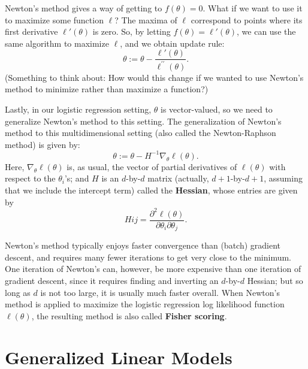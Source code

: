 Newton's method gives a way of getting to $f(\theta) = 0$. What if we want to
use it to maximize some function $\ell$? The maxima of $\ell$ correspond to points
where its first derivative $\ell'(\theta)$ is zero. So, by letting $f(\theta) = \ell'(\theta)$, we can use
the same algorithm to maximize $\ell$, and we obtain update rule:
\begin{equation}
    \theta := \theta - \frac{\ell'(\theta)}{\ell^{\prime\prime}(\theta)}.
\end{equation}
(Something to think about: How would this change if we wanted to use
Newton's method to minimize rather than maximize a function?)

Lastly, in our logistic regression setting, $\theta$ is vector-valued, so we need to
generalize Newton's method to this setting. The generalization of Newton's
method to this multidimensional setting (also called the Newton-Raphson
method) is given by:
\begin{equation}
    \theta := \theta - H^{-1} \nabla_\theta \ell(\theta).
\end{equation}
Here, $\nabla_\theta \ell(\theta)$ is, as usual, the vector of partial derivatives of $\ell(\theta)$ with respect
to the $\theta_i$'s; and $H$ is an $d$-by-$d$ matrix (actually, $d+1$-by-$d+1$, assuming that
we include the intercept term) called the \textbf{Hessian}, whose entries are given by
\begin{equation}
    H ij = \frac{\partial^2 \ell(\theta)}{\partial\theta_i \partial\theta_j}.
\end{equation}

Newton's method typically enjoys faster convergence than (batch) gradient
descent, and requires many fewer iterations to get very close to the
minimum. One iteration of Newton's can, however, be more expensive than
one iteration of gradient descent, since it requires finding and inverting an
$d$-by-$d$ Hessian; but so long as $d$ is not too large, it is usually much faster
overall. When Newton's method is applied to maximize the logistic regression
log likelihood function $\ell(\theta)$, the resulting method is also called \textbf{Fisher
scoring}.



\chapter{Generalized Linear Models}


